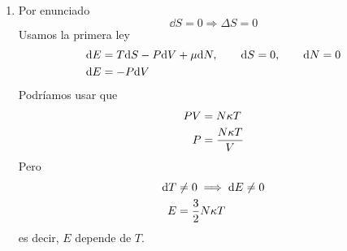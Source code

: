 \begin{sol}
\begin{enumerate}
\item 	

	Por enunciado 
	\begin{equation}
  \dd S=0\Rightarrow\boxed{ \Delta S=0}
\end{equation}
Usamos la primera ley
\begin{align}
  \dd E&=T\dd S-P\dd V+\mu\dd N,\qquad \dd S=0,\qquad \dd N=0\\
  \dd E&=-P\dd V
\end{align}
Podríamos usar que
\begin{align}
  PV&=N\kappa T\\
  P&=\frac{N\kappa T}{V}
\end{align}
Pero 
\begin{align}
  \dd T&\neq 0\implies \dd E\neq 0\\
  E&=\frac{3}{2}N\kappa T
\end{align}
es decir, $E$ depende de $T$.


\end{enumerate}
\end{sol}
